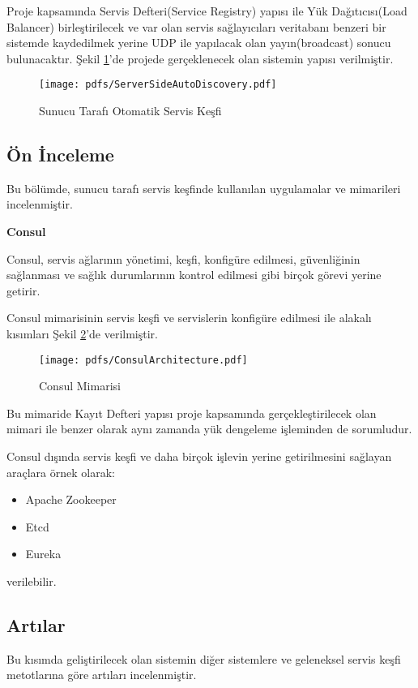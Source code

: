 \documentclass[12pt]{article}
\begin{document}
\begin{justify}
Proje kapsamında Servis Defteri(Service Registry) yapısı ile Yük Dağıtıcısı(Load Balancer) birleştirilecek ve var olan servis sağlayıcıları veritabanı benzeri bir sistemde kaydedilmek yerine UDP ile yapılacak olan yayın(broadcast) sonucu bulunacaktır.
Şekil \ref{fig:autodisc}'de projede gerçeklenecek olan sistemin yapısı verilmiştir.

\begin{figure}[H]
    \centering
    \texttt{[image: pdfs/ServerSideAutoDiscovery.pdf]}
    \caption{Sunucu Tarafı Otomatik Servis Keşfi}
    \label{fig:autodisc}
\end{figure}

\subsection{Ön İnceleme}
Bu bölümde, sunucu tarafı servis keşfinde kullanılan uygulamalar ve mimarileri incelenmiştir.

\textbf{Consul}

Consul, servis ağlarının yönetimi, keşfi, konfigüre edilmesi, güvenliğinin sağlanması ve sağlık durumlarının kontrol edilmesi gibi birçok görevi yerine getirir.

Consul mimarisinin servis keşfi ve servislerin konfigüre edilmesi ile alakalı kısımları Şekil \ref{fig:consul}'de verilmiştir.

\begin{figure}[H]
    \centering
    \texttt{[image: pdfs/ConsulArchitecture.pdf]}
    \caption{Consul Mimarisi}
    \label{fig:consul}
\end{figure}

Bu mimaride Kayıt Defteri yapısı proje kapsamında gerçekleştirilecek olan mimari ile benzer olarak aynı zamanda yük dengeleme işleminden de sorumludur.

Consul dışında servis keşfi ve daha birçok işlevin yerine getirilmesini sağlayan araçlara örnek olarak:

\begin{itemize}
    \item Apache Zookeeper
    \item Etcd
    \item Eureka
\end{itemize}
verilebilir.

\subsection{Artılar}
Bu kısımda geliştirilecek olan sistemin diğer sistemlere ve geleneksel servis keşfi metotlarına göre artıları incelenmiştir.


\end{justify}
\end{document}
